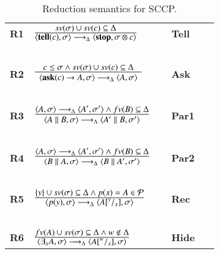 \documentclass[main.tex]{subfiles}
\begin{document}
\def\odiv{\; {\ominus\hspace{-6pt} \div} \;}
\def\odivvv{\; {\ominus\hspace{-6pt} \div} \;}
\begin{table}  %
  
   \begin{center}
   \begin{tabular}{llll} 
   \mbox{\bf R1}& $\frac{\displaystyle sv(\sigma) \cup sv(c) \subseteq \Delta } {\displaystyle \langle \hbox{{\bf tell}}(c), \sigma \rangle \longrightarrow_\Delta  \langle \hbox{{\bf stop}},
                                               \sigma \otimes c\rangle}$
   \ \ \ & \bf{Tell}&
  \\ 
  &\mbox{   }&\mbox{   } &\mbox{   }
  \\
  \mbox{\bf R2}& $\frac {\displaystyle c \leq \sigma \wedge  sv(\sigma) \cup sv(c) \subseteq \Delta}{\displaystyle
  	\begin{array}{l} \langle \hbox{{\bf ask}}(c) \rightarrow A, \sigma \rangle \longrightarrow_\Delta \langle A, \sigma \rangle   	\end{array}}$
    \ \ \ & \bf{Ask}&
    \\
    &\mbox{   }&\mbox{   }&
    \\
  \mbox{\bf R3}& $\frac {\displaystyle \langle A,\sigma \rangle \longrightarrow_\Delta \langle A', \sigma' \rangle
  \wedge fv(B) \subseteq \Delta} 
  {\displaystyle \begin{array}{l}
                          \langle A\parallel B, \sigma \rangle \longrightarrow_\Delta \langle A'\parallel B, \sigma' \rangle
                          \end{array}}$ 
    & \bf{Par1}&
  \\
  & \mbox{   }&\mbox{   }&
  \\
    \mbox{\bf R4}& $\frac {\displaystyle \langle A,\sigma \rangle \longrightarrow_\Delta \langle A', \sigma'   \rangle
    	\wedge fv(B) \subseteq \Delta} 
    {\displaystyle 
    	\begin{array}{l} \langle B\parallel A, \sigma \rangle \longrightarrow_\Delta \langle B\parallel A', \sigma' \rangle
    	\end{array}}$& \bf{Par2}&
    \\
    &\mbox{   }&\mbox{   }&
    \\
  \mbox{\bf R5}& $\frac {\displaystyle \{y\} \cup sv(\sigma) \subseteq \Delta \wedge \displaystyle p(x) = A \in  \mathcal{P} }
  {\displaystyle\langle p(y),\sigma\rangle \longrightarrow_\Delta \langle  A[^y/_x], \sigma\rangle}$ 
  &\bf{Rec}&
    \\
   &\mbox{   }&\mbox{   }&
  \\
    \mbox{\bf R6}& $\frac {\displaystyle fv(A) \cup sv(\sigma) \subseteq \Delta \wedge w \not \in \Delta }
    {\displaystyle\langle \exists_x A,\sigma\rangle \longrightarrow_\Delta \langle A[^w/_x], \sigma\rangle}$
    &\bf{Hide}&
  \end{tabular}
  \end{center}
\caption{Reduction semantics for SCCP.}
\label{fig:operational}
\end{table}
\end{document}
